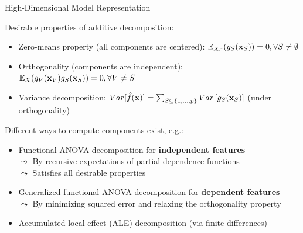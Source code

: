 \documentclass[11pt,compress,t,notes=noshow, aspectratio=169, xcolor=table]{beamer}
\newcommand{\open}{}
\newcommand{\close}{}
\begin{document}
\begin{frame}{High-Dimensional Model Representation}

Desirable properties of additive decomposition:

\begin{itemize}
\item Zero-means property (all components are centered): %
$\mathbb{E}_{X_S} (g_{S}(\xv_S)) = 0, \forall S \neq \emptyset$
\item Orthogonality (components are independent): %
$\mathbb{E}_{X} (g_{V}(\xv_V) g_{S}(\xv_S)) = 0, \forall V \neq S$
\item Variance decomposition:
$ Var[\fh(\xv)] =  \textstyle\sum_{S \subseteq \{1,\ldots,p\}}  Var\left[ g_{S}(\xv_S)\right]$ (under orthogonality)
\end{itemize}

\pause

Different ways to compute components exist, e.g.: %
		\begin{itemize}
			\item %
			Functional ANOVA decomposition for \textbf{independent features}  \\
			$\leadsto$ By recursive expectations of partial dependence functions\\
			$\leadsto$ Satisfies all desirable properties
			\item Generalized functional ANOVA decomposition for \textbf{dependent features}  \\
			$\leadsto$ By minimizing squared error and relaxing the orthogonality property
			\item Accumulated local effect (ALE) decomposition (via finite differences) 
		\end{itemize}

\end{frame}
\end{document}
